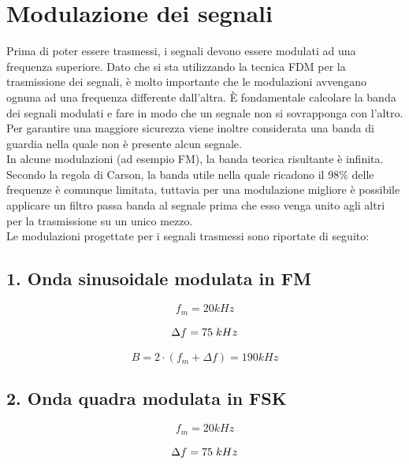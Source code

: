 \documentclass{article}
\begin{document}
\section{Modulazione dei segnali}
Prima di poter essere trasmessi, i segnali devono essere modulati ad una frequenza superiore. Dato che si sta utilizzando la
tecnica FDM per la trasmissione dei segnali, è molto importante che le modulazioni avvengano ognuna ad una frequenza differente
dall'altra. È fondamentale calcolare la banda dei segnali modulati e fare in modo che un segnale non si sovrapponga con l'altro.
Per garantire una maggiore sicurezza viene inoltre considerata una banda di guardia nella quale non è presente alcun segnale.\\
In alcune modulazioni (ad esempio FM), la banda teorica risultante è infinita. Secondo la regola di Carson, la banda utile nella
quale ricadono il 98\% delle frequenze è comunque limitata, tuttavia per una modulazione migliore è possibile applicare un filtro
passa banda al segnale prima che esso venga unito agli altri per la trasmissione su un unico mezzo.\\

Le modulazioni progettate per i segnali trasmessi sono riportate di seguito:

\subsection{1. Onda sinusoidale modulata in FM}
\begin{equation}
    f_m = 20 kHz
\end{equation}

\begin{equation}
    \Delta f = 75 \hspace{0.1cm} kHz
\end{equation}

\begin{equation}
    B = 2 \cdot (f_m + \Delta f) = 190 kHz
\end{equation}

\subsection{2. Onda quadra modulata in FSK}
\begin{equation}
    f_m = 20 kHz
\end{equation}

\begin{equation}
    \Delta f = 75 \hspace{0.1cm} kHz
\end{equation}
\end{document}
